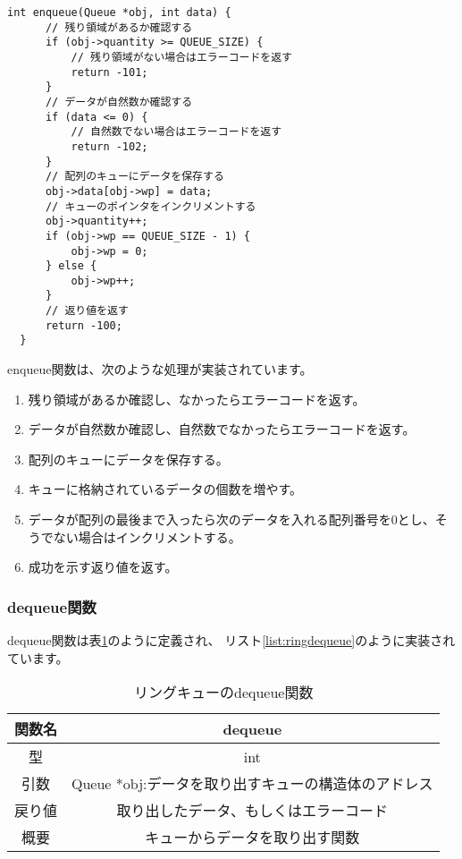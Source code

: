 \documentclass[a4j]{jarticle}
\begin{document}
\begin{lstlisting}[caption=リングキューのenqueue関数の実装,label=list:ringenqueue]
  int enqueue(Queue *obj, int data) {
      // 残り領域があるか確認する
      if (obj->quantity >= QUEUE_SIZE) {
          // 残り領域がない場合はエラーコードを返す
          return -101;
      }
      // データが自然数か確認する
      if (data <= 0) {
          // 自然数でない場合はエラーコードを返す
          return -102;
      }
      // 配列のキューにデータを保存する
      obj->data[obj->wp] = data;
      // キューのポインタをインクリメントする
      obj->quantity++;
      if (obj->wp == QUEUE_SIZE - 1) {
          obj->wp = 0;
      } else {
          obj->wp++;
      }
      // 返り値を返す
      return -100;
  }
\end{lstlisting}

enqueue関数は、次のような処理が実装されています。
\begin{enumerate}
  \item 残り領域があるか確認し、なかったらエラーコードを返す。
  \item データが自然数か確認し、自然数でなかったらエラーコードを返す。
  \item 配列のキューにデータを保存する。
  \item キューに格納されているデータの個数を増やす。
  \item データが配列の最後まで入ったら次のデータを入れる配列番号を0とし、そうでない場合はインクリメントする。
  \item 成功を示す返り値を返す。
\end{enumerate}

\subsubsection{dequeue関数}
dequeue関数は表\ref{table:ringdequeue}のように定義され、
リスト\ref{list:ringdequeue}のように実装されています。

\begin{table}[htbp]
  \centering
  \caption{リングキューのdequeue関数}
  \label{table:ringdequeue}
  \begin{tabular}{|c|c|}
    \hline
    関数名 & dequeue                         \\
    \hline
    型   & int                             \\
    \hline
    引数  & Queue *obj:データを取り出すキューの構造体のアドレス \\
    \hline
    戻り値 & 取り出したデータ、もしくはエラーコード             \\
    \hline
    概要  & キューからデータを取り出す関数                 \\
    \hline
  \end{tabular}
\end{table}
\end{document}
